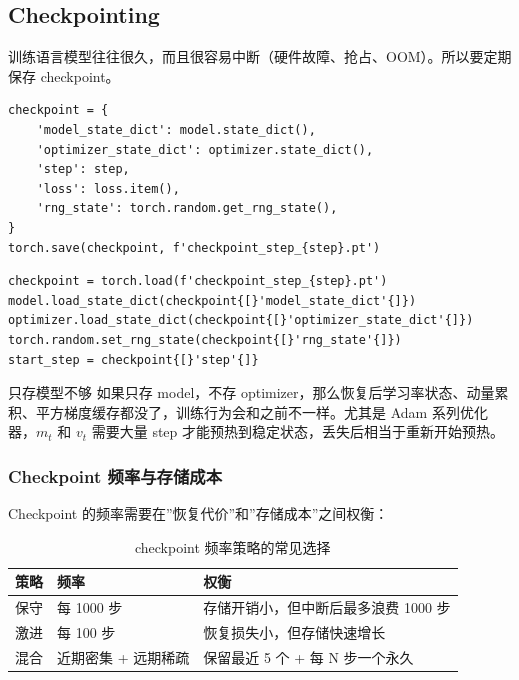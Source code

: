 \subsection{Checkpointing}

训练语言模型往往很久，而且很容易中断（硬件故障、抢占、OOM）。所以要定期保存 checkpoint。

\begin{lstlisting}[caption={保存 checkpoint 的标准写法}]
checkpoint = {
    'model_state_dict': model.state_dict(),
    'optimizer_state_dict': optimizer.state_dict(),
    'step': step,
    'loss': loss.item(),
    'rng_state': torch.random.get_rng_state(),
}
torch.save(checkpoint, f'checkpoint_step_{step}.pt')
\end{lstlisting}

\begin{lstlisting}[caption={恢复 checkpoint 的标准写法}]
checkpoint = torch.load(f'checkpoint_step_{step}.pt')
model.load_state_dict(checkpoint{[}'model_state_dict'{]})
optimizer.load_state_dict(checkpoint{[}'optimizer_state_dict'{]})
torch.random.set_rng_state(checkpoint{[}'rng_state'{]})
start_step = checkpoint{[}'step'{]}
\end{lstlisting}

\begin{warningbox}{只存模型不够}
如果只存 model，不存 optimizer，那么恢复后学习率状态、动量累积、平方梯度缓存都没了，训练行为会和之前不一样。尤其是 Adam 系列优化器，$m_t$ 和 $v_t$ 需要大量 step 才能预热到稳定状态，丢失后相当于重新开始预热。
\end{warningbox}

\subsubsection{Checkpoint 频率与存储成本}

Checkpoint 的频率需要在”恢复代价”和”存储成本”之间权衡：

\begin{table}[H]
\centering
\begin{tabular}{p{}p{}p{}}
\toprule
\textbf{策略} & \textbf{频率} & \textbf{权衡} \\
\midrule
保守 & 每 1000 步 & 存储开销小，但中断后最多浪费 1000 步 \\
激进 & 每 100 步 & 恢复损失小，但存储快速增长 \\
混合 & 近期密集 + 远期稀疏 & 保留最近 5 个 + 每 N 步一个永久 \\
\bottomrule
\end{tabular}
\caption{checkpoint 频率策略的常见选择}
\end{table}

